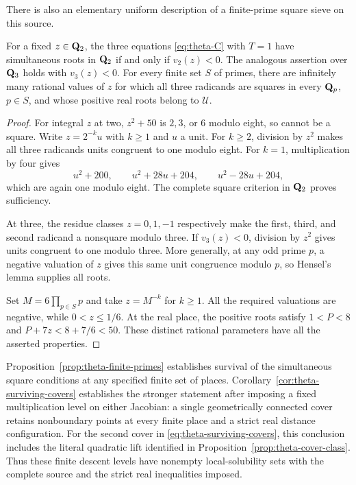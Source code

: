 There is also an elementary uniform description of a finite-prime
square sieve on this source.

\begin{proposition}
\label{prop:theta-finite-primes}
For a fixed $z\in\mathbf Q_2$, the three equations
\eqref{eq:theta-C} with $T=1$ have simultaneous roots in $\mathbf Q_2$ if and
only if $v_2(z)<0$.  The analogous assertion over $\mathbf Q_3$ holds with
$v_3(z)<0$.  For every finite set $S$ of primes, there are infinitely
many rational values of $z$ for which all three radicands are squares
in every $\mathbf Q_p$, $p\in S$, and whose positive real roots belong to
$\mathcal U$.
\end{proposition}

\begin{proof}
For integral $z$ at two, $z^2+50$ is $2,3$, or $6$ modulo eight, so
cannot be a square.  Write $z=2^{-k}u$ with $k\ge1$ and $u$ a unit.
For $k\ge2$, division by $z^2$ makes all three radicands units congruent
to one modulo eight.  For $k=1$, multiplication by four gives
\[
 u^2+200,\qquad u^2+28u+204,\qquad u^2-28u+204,
\]
which are again one modulo eight.  The complete square criterion in
$\mathbf Q_2$ proves sufficiency.

At three, the residue classes $z=0,1,-1$ respectively make the first,
third, and second radicand a nonsquare modulo three.  If $v_3(z)<0$,
division by $z^2$ gives units congruent to one modulo three.  More
generally, at any odd prime $p$, a negative valuation of $z$ gives this
same unit congruence modulo $p$, so Hensel's lemma supplies all roots.

Set $M=6\prod_{p\in S}p$ and take $z=M^{-k}$ for $k\ge1$.
All the required valuations are negative, while $0<z\le1/6$.
At the real place, the positive roots satisfy $1<P<8$ and
$P+7z<8+7/6<50$.  These distinct rational parameters have all the
asserted properties.
\end{proof}

Proposition~\ref{prop:theta-finite-primes} establishes survival of the
simultaneous square conditions at any specified finite set of places.
Corollary~\ref{cor:theta-surviving-covers} establishes the stronger
statement after imposing a fixed multiplication level on either
Jacobian: a single geometrically connected cover retains nonboundary
points at every finite place and a strict real distance configuration.
For the second cover in \eqref{eq:theta-surviving-covers}, this conclusion
includes the literal quadratic lift identified in
Proposition~\ref{prop:theta-cover-class}.  Thus these finite descent
levels have nonempty local-solubility sets with the complete source
and the strict real inequalities imposed.
